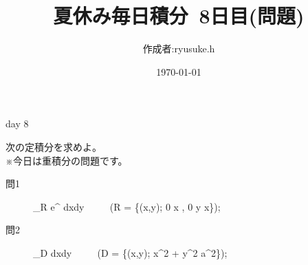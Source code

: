 \documentclass[12pt,a4paper]{jsarticle}
\title{夏休み毎日積分~8日目(問題)}
\date{\today}
\begin{document}
\maketitle
\begin{flushright}
    \author{作成者:ryusuke.h}
\end{flushright}
\begin{itembox}[c]{day 8 }
    \begin{center}
        次の定積分を求めよ。\\
        ※今日は重積分の問題です。
    \end{center}
\end{itembox}

\begin{description}
    \item [問1] {\displaystyle} \iint_R e^{} dxdy ~~~~ (R = \{(x,y); 0 \leq x , 0 \leqq y \leqq x\});
\end{description}

\begin{description}
    \item [問2] {\displaystyle} \iint_D  dxdy ~~~~ (D = \{(x,y); x^2 + y^2 \leqq a^2\});
\end{description}
\end{document}
